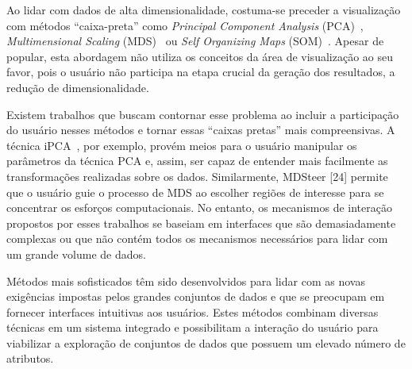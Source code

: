 
Ao lidar com dados de alta dimensionalidade, costuma-se preceder a visualização com métodos ``caixa-preta'' como \textit{Principal Component Analysis} (PCA)~\cite{Wold1987},  \textit{Multimensional Scaling} (MDS)~\cite{Mead1992} ou \textit{Self Organizing Maps} (SOM)~\cite{Kohonen1990}. Apesar de popular, esta abordagem não utiliza os conceitos da área de visualização ao seu favor, pois o usuário não participa na etapa crucial da geração dos resultados, a redução de dimensionalidade.


Existem trabalhos que buscam contornar esse problema ao incluir a participação do usuário nesses métodos e tornar essas ``caixas pretas'' mais compreensivas. A técnica iPCA~\cite{Jeong2009}, por exemplo, provém meios para o usuário manipular os parâmetros da técnica PCA e, assim, ser capaz de entender mais facilmente as transformações realizadas sobre os dados. Similarmente, MDSteer [24] permite que o usuário guie o processo de MDS ao escolher regiões de interesse para se concentrar os esforços computacionais. No entanto, os mecanismos de interação propostos por esses trabalhos se baseiam em interfaces que são demasiadamente complexas ou que não contém todos os mecanismos necessários para lidar com um grande volume de dados.

Métodos mais sofisticados têm sido desenvolvidos para lidar com as novas exigências impostas pelos grandes conjuntos de dados e que se preocupam em fornecer interfaces intuitivas aos usuários. Estes métodos combinam diversas técnicas em um sistema integrado e possibilitam a interação do usuário para viabilizar a exploração de conjuntos de dados que possuem um elevado número de atributos.


